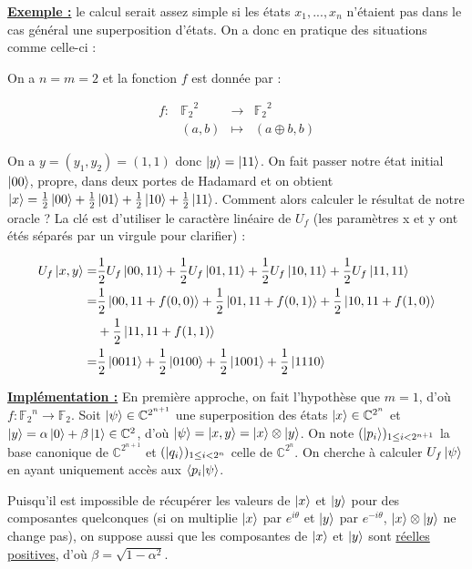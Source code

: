 \documentclass[french]{article}
\newcommand{\exemple}{\textbf{\underline{Exemple :} }}
\newcommand{\fonction}[5]{\begin{array}{l|rcl}
#1: & #2 & \longrightarrow & #3 \\
    & #4 & \longmapsto & #5 \end{array}}
\begin{document}
\noindent \exemple le calcul serait assez simple si les états $x_1, ..., x_n$ n'étaient pas dans le cas général une superposition d'états. On a donc en pratique des situations comme celle-ci :

On a $n = m = 2$ et la fonction $f$ est donnée par :

$$\fonction{f}{{\mathbb{F}_2}^2}{{\mathbb{F}_2}^2}{(a, b)}{(a \oplus b, b)}$$

\noindent On a $y = (y_1, y_2) = (1, 1)$ donc $\ket y = \ket{11}$. On fait passer notre état initial $\ket{00}$, propre, dans deux portes de Hadamard et on obtient $\ket{x} = \frac{1}{2}\ket{00} + \frac{1}{2}\ket{01} + \frac{1}{2} \ket{10} + \frac{1}{2} \ket{11}$.
Comment alors calculer le résultat de notre oracle ? La clé est d'utiliser le caractère linéaire de $U_f$ (les paramètres x et y ont étés séparés par un virgule pour clarifier) :

\begin{equation*}
\begin{split}
    U_f \ket{x, y} =& \frac{1}{2} U_f \ket{00,11} + \frac{1}{2} U_f \ket{01,11} + \frac{1}{2} U_f \ket{10,11} + \frac{1}{2} U_f \ket{11,11} \\
    =& \frac{1}{2} \ket{00,11 + f(0,0)} + \frac{1}{2} \ket{01, 11 + f(0,1)} + \frac{1}{2} \ket{10,11 + f(1,0)} \\
    & + \frac{1}{2} \ket{11, 11 + f(1,1)} \\
    =& \frac{1}{2} \ket{0011} + \frac{1}{2} \ket{0100} + \frac{1}{2} \ket{1001} + \frac{1}{2} \ket{1110}
\end{split}
\end{equation*}


\noindent \underline{\textbf{Implémentation :}} En première approche, on fait l'hypothèse que $m = 1$, d'où $f : {\mathbb{F}_2}^n \rightarrow \mathbb{F}_2$.
Soit $\ket \psi \in \mathbb{C}^{2^{n+1}}$ une superposition des états $\ket x \in \mathbb{C}^{2^n}$ et $\ket y = \alpha \ket 0 + \beta \ket 1 \in \mathbb{C}^{2}$, d'où $\ket \psi = \ket{x, y} = \ket x \otimes \ket y$.
On note $(\ket{p_i})_{1 \le i < 2^{n+1}}$ la base canonique de $\mathbb{C}^{2^{n+1}}$ et $(\ket{q_i})_{1 \le i < 2^n}$ celle de $\mathbb{C}^{2^n}$.
On cherche à calculer $U_f \ket \psi$ en ayant uniquement accès aux $\bra{p_i} \ket{\psi}$.


Puisqu'il est impossible de récupérer les valeurs de $\ket x$ et $\ket y$ pour des composantes quelconques (si on multiplie $\ket x$ par $e^{i\theta}$ et $\ket y$ par $e^{-i\theta}$, $\ket x \otimes \ket y$ ne change pas), on suppose aussi que les composantes de $\ket x$ et $\ket y$ sont \underline{réelles positives}, d'où $\beta = \sqrt{1 - \alpha^2}$.
\end{document}
